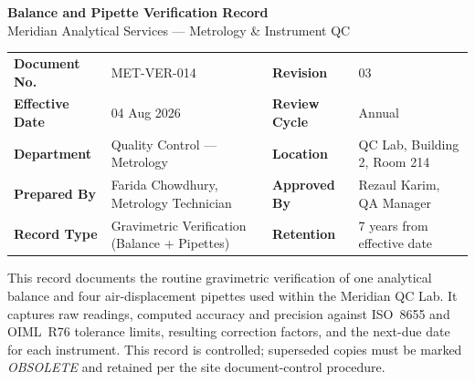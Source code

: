\begin{center}
  {\LARGE\bfseries\color{labnavy} Balance and Pipette Verification Record}\\[3pt]
  {\large\color{labteal} Meridian Analytical Services --- Metrology \& Instrument QC}\\[10pt]
\end{center}

\begin{tcolorbox}[recordbox]
  \begin{tabularx}{\linewidth}{@{}l X l X@{}}
    \textbf{Document No.}   & MET-VER-014                          & \textbf{Revision}     & 03 \\
    \textbf{Effective Date} & 04 Aug 2026                          & \textbf{Review Cycle} & Annual \\
    \textbf{Department}     & Quality Control --- Metrology        & \textbf{Location}     & QC Lab, Building 2, Room 214 \\
    \textbf{Prepared By}    & Farida Chowdhury, Metrology Technician & \textbf{Approved By} & Rezaul Karim, QA Manager \\
    \textbf{Record Type}    & Gravimetric Verification (Balance + Pipettes) & \textbf{Retention} & 7 years from effective date \\
  \end{tabularx}
\end{tcolorbox}

\vspace{4pt}
\noindent
This record documents the routine gravimetric verification of one analytical balance and four
air-displacement pipettes used within the Meridian QC Lab. It captures raw readings, computed
accuracy and precision against ISO~8655 and OIML~R76 tolerance limits, resulting correction
factors, and the next-due date for each instrument. This record is controlled; superseded copies
must be marked \textit{OBSOLETE} and retained per the site document-control procedure.
